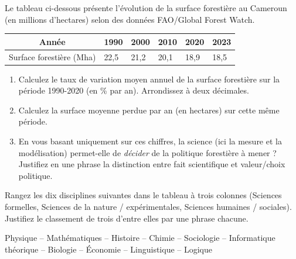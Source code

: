 \documentclass[11pt]{article}
\newcommand{\cle}[1]{{\popxbold\color{popdark}#1}}
\newcounter{popsec}
\newcounter{popsub}
\newcommand{\courssub}[1]{%
  \stepcounter{popsub}%
  \par\vspace{9pt}\noindent{\popxbold\fontsize{11.5}{13}\selectfont\color{popink}{\color{poporange}\thepopsec.\thepopsub}\hspace{6pt}#1}\par\nopagebreak\vspace{4pt}
}
\begin{document}
\begin{exercice}
Le tableau ci-dessous présente l'évolution de la surface forestière au Cameroun (en millions d'hectares) selon des données FAO/Global Forest Watch.
\begin{center}
\begin{tabularx}{\linewidth}{|c|X|X|X|X|X|}\hline
Année & 1990 & 2000 & 2010 & 2020 & 2023 \\ \hline
Surface forestière (Mha) & 22,5 & 21,2 & 20,1 & 18,9 & 18,5 \\ \hline
\end{tabularx}
\end{center}
\begin{enumerate}
    \item Calculez le taux de variation moyen annuel de la surface forestière sur la période 1990-2020 (en \% par an). Arrondissez à deux décimales.
    \item Calculez la surface moyenne perdue par an (en hectares) sur cette même période.
    \item En vous basant uniquement sur ces chiffres, la science (ici la mesure et la modélisation) permet-elle de \emph{décider} de la politique forestière à mener ? Justifiez en une phrase la distinction entre \cle{fait scientifique} et \cle{valeur/choix politique}.
\end{enumerate}
\end{exercice}

\courssub{Je m'entraîne}

\begin{exercice}
Rangez les dix disciplines suivantes dans le tableau à trois colonnes (Sciences formelles, Sciences de la nature / expérimentales, Sciences humaines / sociales). Justifiez le classement de trois d'entre elles par une phrase chacune.
\begin{center}
Physique -- Mathématiques -- Histoire -- Chimie -- Sociologie -- Informatique théorique -- Biologie -- Économie -- Linguistique -- Logique
\end{center}
\end{exercice}
\end{document}
